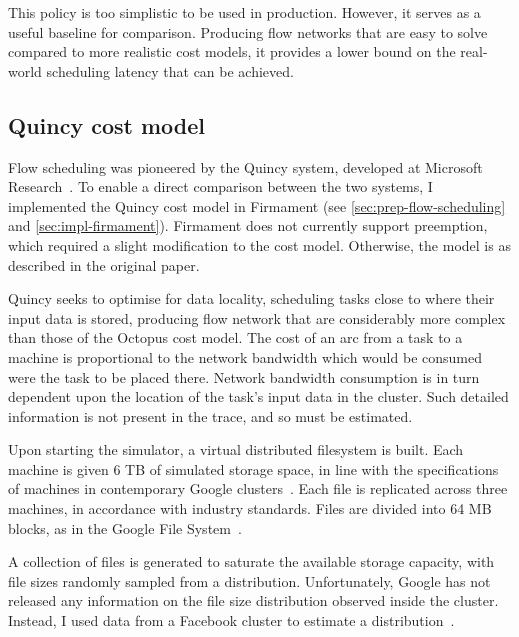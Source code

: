 This policy is too simplistic to be used in production. However, it serves as a useful baseline for comparison. Producing flow networks that are easy to solve compared to more realistic cost models, it provides a lower bound on the real-world scheduling latency that can be achieved.

\subsection{Quincy cost model} \label{sec:eval-benchmark-strategy-quincy}

Flow scheduling was pioneered by the Quincy system, developed at Microsoft Research~\cite{Isard:2009}. To enable a direct comparison between the two systems, I implemented the Quincy cost model in Firmament (see \cref{sec:prep-flow-scheduling} and \cref{sec:impl-firmament}). Firmament does not currently support preemption, which required a slight modification to the cost model\footnotemark. Otherwise, the model is as described in the original paper.

Quincy seeks to optimise for data locality, scheduling tasks close to where their input data is stored, producing flow network that are considerably more complex than those of the Octopus cost model. The cost of an arc from a task to a machine is proportional to the network bandwidth which would be consumed were the task to be placed there. Network bandwidth consumption is in turn dependent upon the location of the task's input data in the cluster. Such detailed information is not present in the trace, and so must be estimated.

Upon starting the simulator, a virtual distributed filesystem is built. Each machine is given 6 TB of simulated storage space, in line with the specifications of machines in contemporary Google clusters~\cite{Fikes:2010}. Each file is replicated across three machines, in accordance with industry standards. Files are divided into 64 MB blocks, as in the Google File System~\cite{Ghemawat:2003}.

A collection of files is generated to saturate the available storage capacity\footnotemark, with file sizes randomly sampled from a distribution. Unfortunately, Google has not released any information on the file size distribution observed inside the cluster. Instead, I used data from a Facebook cluster to estimate a distribution~\cite{Chen:2012}.

